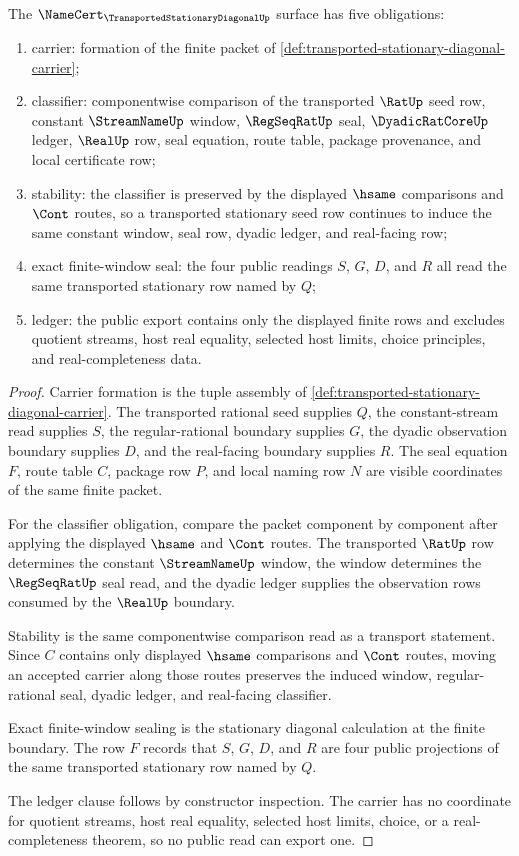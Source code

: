 \begin{theorem}
\label{thm:transported-stationary-diagonal-namecert-obligations}
The $\NameCert_{\TransportedStationaryDiagonalUp}$ surface has five obligations:
\begin{enumerate}
\item carrier: formation of the finite packet of \autoref{def:transported-stationary-diagonal-carrier};
\item classifier: componentwise comparison of the transported $\RatUp$ seed row, constant $\StreamNameUp$ window, $\RegSeqRatUp$ seal, $\DyadicRatCoreUp$ ledger, $\RealUp$ row, seal equation, route table, package provenance, and local certificate row;
\item stability: the classifier is preserved by the displayed $\hsame$ comparisons and $\Cont$ routes, so a transported stationary seed row continues to induce the same constant window, seal row, dyadic ledger, and real-facing row;
\item exact finite-window seal: the four public readings $S$, $G$, $D$, and $R$ all read the same transported stationary row named by $Q$;
\item ledger: the public export contains only the displayed finite rows and excludes quotient streams, host real equality, selected host limits, choice principles, and real-completeness data.
\end{enumerate}
\end{theorem}
\begin{proof}
Carrier formation is the tuple assembly of \autoref{def:transported-stationary-diagonal-carrier}. The transported rational seed supplies $Q$, the constant-stream read supplies $S$, the regular-rational boundary supplies $G$, the dyadic observation boundary supplies $D$, and the real-facing boundary supplies $R$. The seal equation $F$, route table $C$, package row $P$, and local naming row $N$ are visible coordinates of the same finite packet.

For the classifier obligation, compare the packet component by component after applying the displayed $\hsame$ and $\Cont$ routes. The transported $\RatUp$ row determines the constant $\StreamNameUp$ window, the window determines the $\RegSeqRatUp$ seal read, and the dyadic ledger supplies the observation rows consumed by the $\RealUp$ boundary.

Stability is the same componentwise comparison read as a transport statement. Since $C$ contains only displayed $\hsame$ comparisons and $\Cont$ routes, moving an accepted carrier along those routes preserves the induced window, regular-rational seal, dyadic ledger, and real-facing classifier.

Exact finite-window sealing is the stationary diagonal calculation at the finite boundary. The row $F$ records that $S$, $G$, $D$, and $R$ are four public projections of the same transported stationary row named by $Q$.

The ledger clause follows by constructor inspection. The carrier has no coordinate for quotient streams, host real equality, selected host limits, choice, or a real-completeness theorem, so no public read can export one.
\end{proof}

